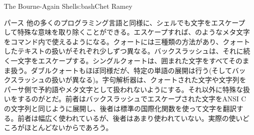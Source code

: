 \begin{aosachapter}{The Bourne-Again Shell}{s:bash}{Chet Ramey}
\begin{aosasect1}{パース}
他の多くのプログラミング言語と同様に、シェルでも文字をエスケープして特殊な意味を取り除くことができる。エスケープすれば、\code{\&}のようなメタ文字をコマンド内で使えるようになる。クォートには三種類の方法があり、クォートしたテキストの扱いがそれぞれ少しずつ異なる。バックスラッシュは、それに続く一文字をエスケープする。シングルクォートは、囲まれた文字をすべてそのまま扱う。ダブルクォートもほぼ同様だが、特定の単語の展開は行う(そしてバックスラッシュの扱いが異なる)。字句解析器は、クォートされた文字や文字列をパーサ側で予約語やメタ文字として扱われないようにする。それ以外に特殊な扱いをするのがとだ。前者はバックスラッシュでエスケープされた文字をANSI Cの文字列と同じように展開し、後者は標準の国際化関数を使って文字を翻訳する。前者は幅広く使われているが、後者はあまり使われていない。実際の使いどころがほとんどないからであろう。


\end{aosasect1}
\end{aosachapter}
